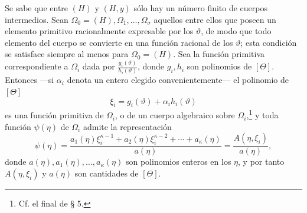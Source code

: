 \documentclass[11pt]{article}
\begin{document}
Se sabe que entre $(H)$ y $(H,y)$ sólo hay un número finito de cuerpos intermedios. Sean $\Omega_0=(H),\Omega_1,\ldots,\Omega_\sigma$ aquellos entre ellos que poseen un elemento primitivo racionalmente expresable por los $\vartheta$, de modo que todo elemento del cuerpo se convierte en una función racional de los $\vartheta$; esta condición se satisface siempre al menos para $\Omega_0=(H)$. Sea la función primitiva correspondiente a $\Omega_i$ dada por $\frac{g_i(\vartheta)}{h_i(\vartheta)}$, donde $g_i,h_i$ son polinomios de $[\Theta]$. Entonces ---si $\alpha_i$ denota un entero elegido convenientemente--- el polinomio de $[\Theta]$
\[
 \xi_i=g_i(\vartheta)+\alpha_i h_i(\vartheta)
\]
es una función primitiva de $\Omega_i$, o de un cuerpo algebraico sobre $\Omega_i$,\footnote{Cf. el final de § 5.} y toda función $\psi(\eta)$ de $\Omega_i$ admite la representación
\begin{equation}
\psi(\eta)=
\frac{a_1(\eta)\xi_i^{\kappa-1}+a_2(\eta)\xi_i^{\kappa-2}+\cdots+a_\kappa(\eta)}
     {a(\eta)}
=\frac{A(\eta,\xi_i)}{a(\eta)},
\tag{2}
\end{equation}
donde $a(\eta),a_1(\eta),\ldots,a_\kappa(\eta)$ son polinomios enteros en los $\eta$, y por tanto $A(\eta,\xi_i)$ y $a(\eta)$ son cantidades de $[\Theta]$.
\end{document}
